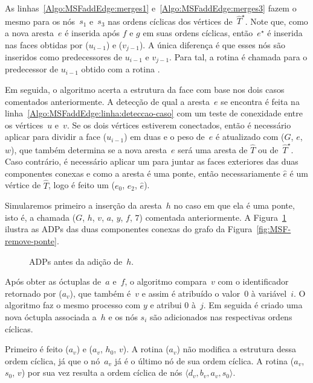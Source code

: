 As linhas~\ref{Algo:MSFaddEdge:merges1} e~\ref{Algo:MSFaddEdge:merges3} fazem o mesmo para os nós~$s_1$ e~$s_3$ nas ordens cíclicas dos vértices de~$\hat T^\star$.
Note que, como a nova aresta~$e$ é inserida após $f$ e $g$ em suas ordens cíclicas, então~$e^\star$ é inserida nas faces obtidas por \LCOFindNode($u_{i-1}$) e \LCOFindNode($v_{j-1}$).
A única diferença é que esses nós são inseridos como predecessores de $u_{i-1}$ e $v_{j-1}$.
Para tal, a rotina \LCOCycle{} é chamada para o predecessor de $u_{i-1}$ obtido com a rotina \treapPredecessor.

Em seguida, o algoritmo acerta a estrutura da face com base nos dois casos comentados anteriormente.
A detecção de qual a aresta~$e$ se encontra é feita na linha~\ref{Algo:MSFaddEdge:linha:deteccao-caso} com um teste de conexidade entre os vértices~$u$ e~$v$.
Se os dois vértices estiverem conectados, então é necessário aplicar \LCOSplit{} para dividir a face \LCOFindNode($u_{i-1}$) em duas e o peso de~$e$ é atualizado com \MSFupdate($G$, $e$, $w$), que também determina se a nova aresta~$e$ será uma aresta de $\hat T$ ou de~$\hat T^\star$.
Caso contrário, é necessário aplicar um \LCOMerge{} para juntar as faces exteriores das duas componentes conexas e como a aresta é uma ponte, então necessariamente $\hat e$ é um vértice de $\hat T$, logo é feito um \LCOMerge($e_0$, $e_2$, $\hat e$).

Simularemos primeiro a inserção da aresta~$h$ no caso em que ela é uma ponte, isto é, a chamada \MSFaddEdge($G$, $h$, $v$, $a$, $y$, $f$, $7$) comentada anteriormente.
A Figura~\ref{fig:MSF-adiciona-ponte-1} ilustra as ADPs das duas componentes conexas do grafo da Figura~\ref{fig:MSF-remove-ponte}.

\begin{figure}
\scalebox{1}{

}
\caption{ADPs antes da adição de~$h$.}
\label{fig:MSF-adiciona-ponte-1}
\end{figure}

Após obter as óctuplas de~$a$ e~$f$, o algoritmo compara~$v$ com o identificador retornado por \LCOFindNode($a_v$), que também é~$v$ e assim é atribuído o valor~$0$ à variável~$i$.
O algoritmo faz o mesmo processo com $y$ e atribui $0$ à~$j$.
Em seguida é criado uma nova óctupla associada a~$h$ e os nós $s_i$ são adicionados nas respectivas ordens cíclicas.

Primeiro é feito \LCOCycle($a_v$) e \LCOMerge($a_v$, $h_0$, $v$).
A rotina \LCOCycle($a_v$) não modifica a estrutura dessa ordem cíclica, já que o nó~$a_v$ já é o último nó de sua ordem cíclica.
A rotina \LCOMerge($a_v$, $s_0$, $v$) por sua vez resulta a ordem cíclica de nós $\langle d_v, b_v, a_v, s_0 \rangle$.

